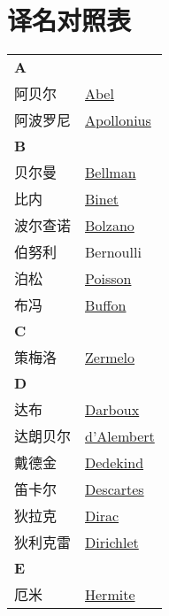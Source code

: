 \chapter{译名对照表}
\def\InsertTable#1{\begin{longtable}{ll} #1 \end{longtable}}%
\InsertTable{
    \textbf{A} \\
    阿贝尔 & \href{https://mathshistory.st-andrews.ac.uk/Biographies/Abel/}{Abel} \\
    阿波罗尼 & \href{https://mathshistory.st-andrews.ac.uk/Biographies/Apollonius/}{Apollonius} \\
    \textbf{B} \\
    贝尔曼 & \href{https://mathshistory.st-andrews.ac.uk/Biographies/Bellman/}{Bellman} \\
    比内 & \href{https://mathshistory.st-andrews.ac.uk/Biographies/Binet/}{Binet} \\
    波尔查诺 & \href{https://mathshistory.st-andrews.ac.uk/Biographies/Bolzano/}{Bolzano} \\
    伯努利 & Bernoulli \\
    泊松 & \href{https://mathshistory.st-andrews.ac.uk/Biographies/Poisson/}{Poisson} \\
    布冯 & \href{https://mathshistory.st-andrews.ac.uk/Biographies/Buffon/}{Buffon} \\
    \textbf{C} \\
    策梅洛 & \href{https://mathshistory.st-andrews.ac.uk/Biographies/Zermelo/}{Zermelo} \\
    \textbf{D} \\
    达布 & \href{https://mathshistory.st-andrews.ac.uk/Biographies/Darboux/}{Darboux} \\
    达朗贝尔 & \href{https://mathshistory.st-andrews.ac.uk/Biographies/DAlembert/}{d'Alembert} \\
    戴德金 & \href{https://mathshistory.st-andrews.ac.uk/Biographies/Dedekind/}{Dedekind} \\
    笛卡尔 & \href{https://mathshistory.st-andrews.ac.uk/Biographies/Descartes/}{Descartes} \\
    狄拉克 & \href{https://mathshistory.st-andrews.ac.uk/Biographies/Dirac/}{Dirac} \\
    狄利克雷 & \href{https://mathshistory.st-andrews.ac.uk/Biographies/Dirichlet/}{Dirichlet} \\
    \textbf{E} \\
    厄米 & \href{https://mathshistory.st-andrews.ac.uk/Biographies/Hermite/}{Hermite} \\
}
